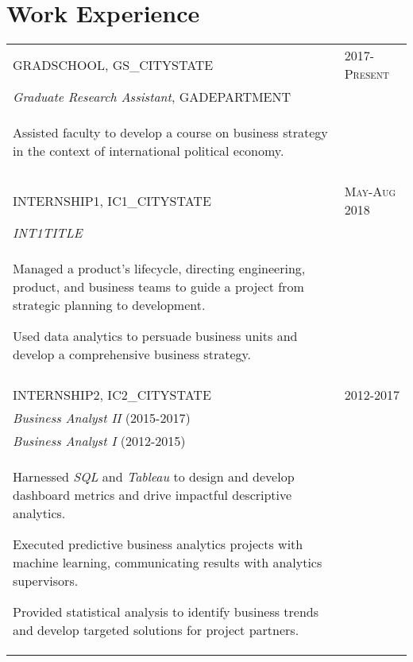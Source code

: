 \documentclass[a4paper,10pt]{article}
\begin{document}
\section{Work Experience}
\begin{supertabular}{p{13.9cm}>{\raggedleft\arraybackslash}p{3.4cm}}
	\textsc{GRADSCHOOL}, GS_CITYSTATE
	& \textsc{2017-Present} \\

	\small	\emph{Graduate Research Assistant}, \small GADEPARTMENT & \\
	\begin{enumerate*}[label =$\circ$,itemjoin={\newline}]
		\item \footnotesize Assisted faculty to develop a course on business strategy in the context of international political economy.
	\end{enumerate*} & \\ 

	 \\

	\textsc{INTERNSHIP1}, IC1_CITYSTATE 
	& \textsc{May-Aug 2018} \\
	\small	\emph{INT1TITLE} & \\
	\begin{enumerate*}[label =$\circ$, itemjoin={\newline}]
		\item \footnotesize Managed a product's lifecycle, directing engineering, product, and business teams to guide a project from strategic planning to development.
		\item \footnotesize Used data analytics to persuade business units and develop a comprehensive business strategy.
	\end{enumerate*} & \\
	 \\
	



	\textsc{INTERNSHIP2}, IC2_CITYSTATE 
	& \textsc{2012-2017} \\
	\small	\emph{Business Analyst II} (2015-2017) & \\
	\small	\emph{Business Analyst I} (2012-2015) & \\
	\begin{enumerate*}[label =$\circ$, itemjoin={\newline}]
		\item \footnotesize Harnessed \emph{SQL} and \emph{Tableau} to design and develop dashboard metrics and drive impactful descriptive analytics.
		\item \footnotesize Executed predictive business analytics projects with machine learning, communicating results with analytics supervisors.
		\item \footnotesize Provided statistical analysis to identify business trends and develop targeted solutions for project partners.


\end{enumerate*}
\end{supertabular}
\end{document}
